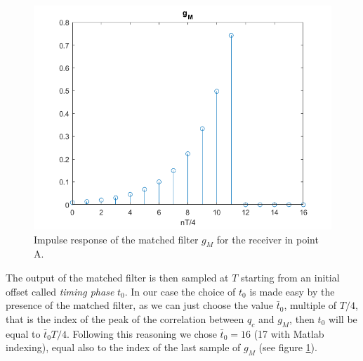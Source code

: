 \documentclass[a4paper,11.5pt]{article}
\begin{document}
\begin{figure}[H]
	\begin{center}   
		\includegraphics[width=\textwidth]{figs/A_gm.png} 
		\caption{Impulse response of the matched filter $g_{M}$ for the receiver in point A.}
		\label{fig:A_gm}
	\end{center}
\end{figure} 

The output of the matched filter is then sampled at $T$ starting from an initial offset called \emph{timing phase} $t_0$. In our case the choice of $t_0$ is made easy by the presence of the matched filter, as we can just choose the value $\bar{t}_0$, multiple of $T/4$, that is the index of the peak of the correlation between $q_c$ and $g_M$, then $t_0$ will be equal to $\bar{t}_0 T/4$. Following this reasoning we chose $\bar{t}_0=16$ (17 with Matlab indexing), equal also to the index of the last sample of $g_M$ (see figure \ref{fig:A_gm}).
\end{document}
